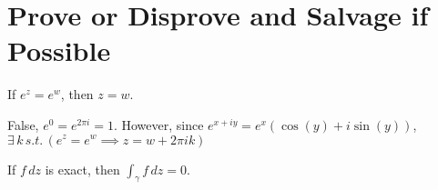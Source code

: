 \documentclass{homework}
\begin{document}
                                                                                                  \section{Prove or Disprove and Salvage if Possible}

                                                                                                  \begin{problem}
                                                                                                    If $e^z = e^w$, then $z = w$.
                                                                                                    \end{problem}
                                                                                                    \begin{solution}
                                                                                                    False, $e^0 = e^{2\pi i}= 1$. However, since $e^{x + iy} = e^x(\cos(y) + i\sin(y))$, $\exists \, k \, s.t. \, (e^z = e^w \implies z = w + 2\pi ik)$
                                                                                                    \end{solution}
                                                                                                    \begin{problem}
                                                                                                      If $f \, dz$ is exact, then $\displaystyle\int_\gamma f \, dz = 0$.
                                                                                                      \end{problem}
\end{document}
